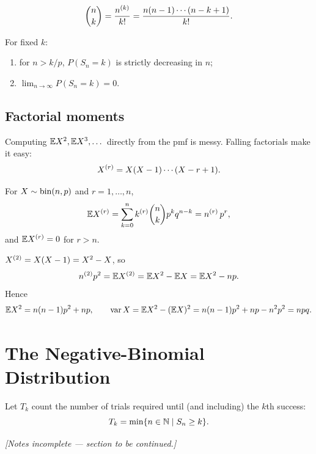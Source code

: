 \begin{corollary}
\[
\binom{n}{k} = \frac{n^{(k)}}{k!} = \frac{n(n-1)\cdots(n-k+1)}{k!}.
\]
\end{corollary}

\begin{proposition}
For fixed $k$:
\begin{enumerate}[label=(\roman*)]
  \item for $n > k/p$, $P(S_n = k)$ is strictly decreasing in $n$;
  \item $\displaystyle\lim_{n\to\infty} P(S_n = k) = 0$.
\end{enumerate}
\end{proposition}

\subsection{Factorial moments}

Computing $\mathbb{E} X^2, \mathbb{E} X^3, \dots$ directly from the pmf is messy. Falling factorials make it easy:
\[
X^{(r)} = X(X-1)\cdots(X-r+1).
\]

\begin{proposition}
For $X \sim \operatorname{bin}(n,p)$ and $r = 1,\dots,n$,
\[
\mathbb{E} X^{(r)} = \sum_{k=0}^{n} k^{(r)} \binom{n}{k} p^k q^{n-k} = n^{(r)}\, p^r,
\]
and $\mathbb{E} X^{(r)} = 0$ for $r > n$.
\end{proposition}

\begin{example}
$X^{(2)} = X(X-1) = X^2 - X$, so
\[
n^{(2)} p^2 = \mathbb{E} X^{(2)} = \mathbb{E} X^2 - \mathbb{E} X = \mathbb{E} X^2 - np.
\]
Hence
\[
\mathbb{E} X^2 = n(n-1)p^2 + np, \qquad
\operatorname{var} X = \mathbb{E} X^2 - (\mathbb{E} X)^2 = n(n-1)p^2 + np - n^2p^2 = npq.
\]
\end{example}

\section{The Negative-Binomial Distribution}

Let $T_k$ count the number of trials required until (and including) the $k$th success:
\[
T_k = \min\{ n \in \mathbb{N} \mid S_n \ge k \}.
\]

\begin{center}
\color{Gray}\itshape [Notes incomplete --- section to be continued.]
\end{center}
